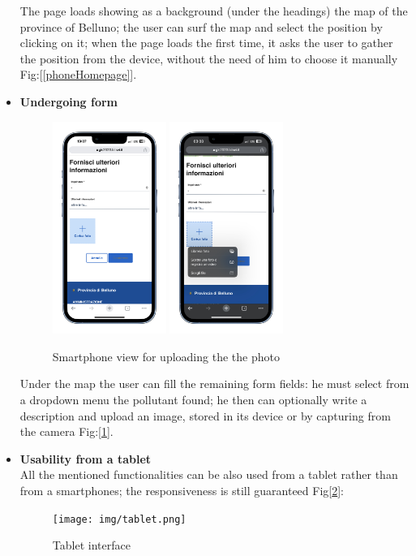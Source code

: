 \begin{itemize}
    The page loads showing as a background (under the headings) the map of the province of Belluno; the user can surf the map and select the position by clicking on it; when the page loads the first time, it asks the user to gather the position from the device, without the need of him to choose it manually Fig:[\ref{phoneHomepage}]. \\
    \pagebreak
    \item \textbf{Undergoing form} \\
    \begin{figure}[H] \centering \includegraphics[width=10em]{img/form.png} \includegraphics[width=10em]{img/foto.png} \caption{Smartphone view for uploading the the photo} \label{uploafPhoto} \end{figure}
    Under the map the user can fill the remaining form fields: he must select from a dropdown menu the pollutant found; he then can optionally write a description and upload an image, stored in its device or by capturing from the camera Fig:[\ref{uploafPhoto}].
    \vspace{3ex}
    \item \textbf{Usability from a tablet} \\
    All the mentioned functionalities can be also used from a tablet rather than from a smartphones; the responsiveness is still guaranteed Fig[\ref{tablet}]: 
    \begin{figure}[H] \centering \texttt{[image: img/tablet.png]} \caption{Tablet interface} \label{tablet} \end{figure}
\end{itemize} 
